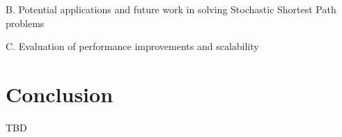 \documentclass{article}
\begin{document}
B. Potential applications and future work in solving Stochastic Shortest Path problems

C. Evaluation of performance improvements and scalability
\section{Conclusion}

TBD

\begin{comment}
\section{Submission of papers to NeurIPS 2020}

NeurIPS requires electronic submissions.  The electronic submission site is
\begin{center}
  \url{https://cmt3.research.microsoft.com/NeurIPS2020/}
\end{center}

Please read the instructions below carefully and follow them faithfully.

\subsection{Style}

Papers to be submitted to NeurIPS 2020 must be prepared according to the
instructions presented here. Papers may only be up to eight pages long,
including figures. Additional pages \emph{containing only a section on the broader impact, acknowledgments and/or cited references} are allowed. Papers that exceed eight pages of content will not be reviewed, or in any other way considered for
presentation at the conference.

The margins in 2020 are the same as those in 2007, which allow for $\sim$$15\%$
more words in the paper compared to earlier years.

Authors are required to use the NeurIPS \LaTeX{} style files obtainable at the
NeurIPS website as indicated below. Please make sure you use the current files
and not previous versions. Tweaking the style files may be grounds for
rejection.

\subsection{Retrieval of style files}

The style files for NeurIPS and other conference information are available on
the World Wide Web at
\begin{center}
  \url{http://www.neurips.cc/}
\end{center}
The file \verb+neurips_2020.pdf+ contains these instructions and illustrates the
various formatting requirements your NeurIPS paper must satisfy.


\end{comment}
\end{document}

